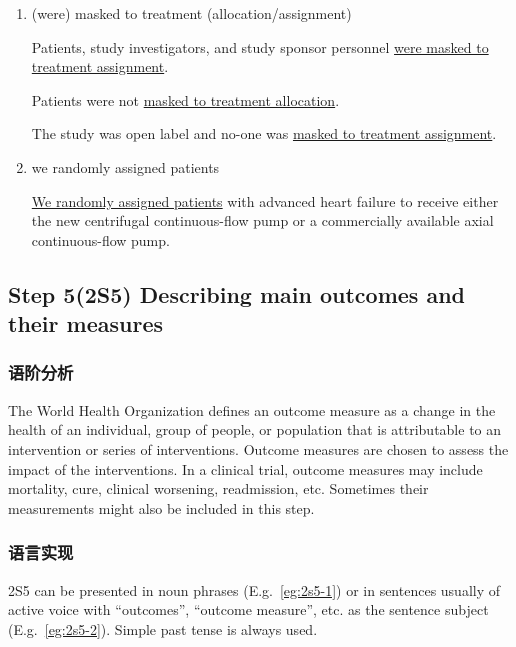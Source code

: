 \documentclass[a4paper]{ctexbook}
\begin{document}
\begin{enumerate}
      \item (were) masked to treatment (allocation/assignment)
      \begin{eg}{}
        Patients, study investigators, and study sponsor personnel \uline{were masked to treatment assignment}.
      \end{eg}
      \begin{eg}{}
        Patients were not \uline{masked to treatment allocation}.
      \end{eg}
      \begin{eg}{}
        The study was open label and no-one was \uline{masked to treatment assignment}.
      \end{eg}

      \item we randomly assigned patients
      \begin{eg}{}
        \uline{We randomly assigned patients} with advanced heart failure to receive either the new centrifugal continuous-flow pump or a commercially available axial continuous-flow pump.
      \end{eg}
    \end{enumerate}

  \subsection{Step 5(2S5) Describing main outcomes and their measures}

    \subsubsection{语阶分析}

    The World Health Organization defines an outcome measure as a change in the health of an individual, group of people, or population that is attributable to an intervention or series of interventions. Outcome measures are chosen to assess the impact of the interventions. In a clinical trial, outcome measures may include mortality, cure, clinical worsening, readmission, etc. Sometimes their measurements might also be included in this step.

    \subsubsection{语言实现}

    2S5 can be presented in noun phrases (E.g.~\ref{eg:2s5-1}) or in sentences usually of active voice with ``outcomes'', ``outcome measure'', etc. as the sentence subject (E.g.~\ref{eg:2s5-2}). Simple past tense is always used.
\end{document}
